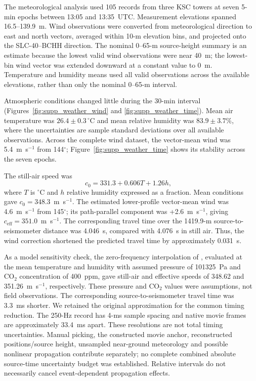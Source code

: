 \documentclass[]{seismica}
\begin{document}
The meteorological analysis used 105 records from three KSC towers at seven
5-min epochs between 13:05 and 13:35~UTC. Measurement elevations spanned
16.5--139.9~m. Wind observations were converted from meteorological direction
to east and north vectors, averaged within 10-m elevation bins, and projected
onto the SLC-40--BCHH direction. The nominal 0--65-m source-height summary is
an estimate because the lowest valid wind observations were near 40~m; the
lowest-bin wind vector was extended downward at a constant value to 0~m.
Temperature and humidity means used all valid observations across the
available elevations, rather than only the nominal 0--65-m interval.

Atmospheric conditions changed little during the 30-min interval
(Figures~\ref{fig:supp_weather_wind} and
\ref{fig:supp_weather_time}). Mean air temperature was
$26.4\pm0.3\,^{\circ}$C and mean relative humidity was
$83.9\pm3.7\%$, where the uncertainties are sample standard deviations over
all available observations. Across the complete wind dataset, the vector-mean
wind was 5.4~m~s$^{-1}$ from 144$^\circ$; Figure~\ref{fig:supp_weather_time}
shows its stability across the seven epochs.

The still-air speed was
\begin{equation}
 c_0=331.3+0.606T+1.26h,
\end{equation}
where $T$ is $^\circ$C and $h$ relative humidity expressed as a fraction. Mean
conditions gave $c_0=348.3$~m~s$^{-1}$. The estimated lower-profile
vector-mean wind was 4.6~m~s$^{-1}$ from 145$^\circ$; its path-parallel
component was +2.6~m~s$^{-1}$, giving
$c_{\mathrm{eff}}=351.0$~m~s$^{-1}$. The corresponding travel time over
the 1419.9-m source-to-seismometer distance was 4.046~s, compared with 4.076~s in still air. Thus, the wind
correction shortened the predicted travel time by approximately 0.031~s.

As a model sensitivity check, the zero-frequency interpolation of
\citet{cramer1993speed}, evaluated at the mean temperature and humidity with
assumed pressure of 101325~Pa and CO$_2$ concentration of 400~ppm, gave
still-air and effective speeds of 348.62 and 351.26~m~s$^{-1}$, respectively.
These pressure and CO$_2$ values were assumptions, not field observations.
The corresponding source-to-seismometer travel time was 3.3~ms shorter.
We retained the original approximation for the common timing reduction.
The 250-Hz record has 4-ms sample spacing and native movie frames are
approximately 33.4~ms apart. These resolutions are not total timing
uncertainties. Manual picking, the constructed movie anchor, reconstructed
positions/source height, unsampled near-ground meteorology and possible
nonlinear propagation contribute separately; no complete combined absolute
source-time uncertainty budget was established. Relative intervals do not
necessarily cancel event-dependent propagation effects.
\end{document}
